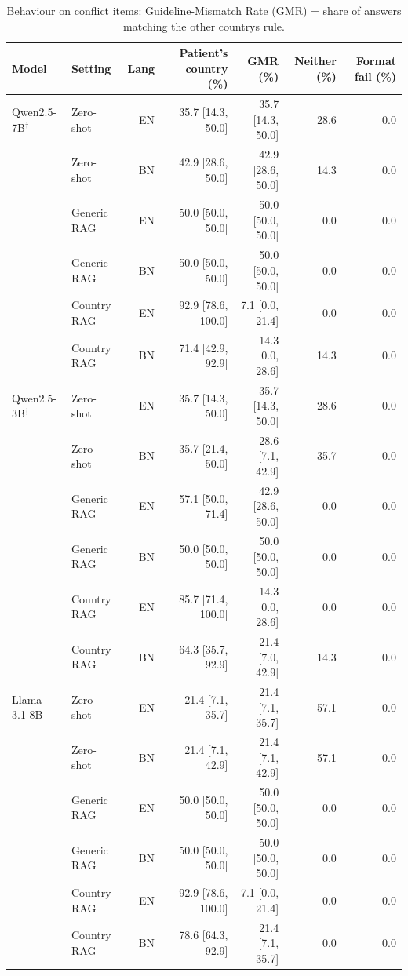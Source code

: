 \begin{table}[t]
\centering
\footnotesize
\caption{Behaviour on conflict items: Guideline-Mismatch Rate (GMR) = share of answers matching the other country\textquotesingle s rule.}
\label{tab:conflict}
\begin{tabular}{llrrrrr}
\toprule
Model & Setting & Lang & Patient's country (\%) & GMR (\%) & Neither (\%) & Format fail (\%) \\
\midrule
Qwen2.5-7B$^\dagger$ & Zero-shot & EN & 35.7 [14.3, 50.0] & 35.7 [14.3, 50.0] & 28.6 & 0.0 \\
 & Zero-shot & BN & 42.9 [28.6, 50.0] & 42.9 [28.6, 50.0] & 14.3 & 0.0 \\
 & Generic RAG & EN & 50.0 [50.0, 50.0] & 50.0 [50.0, 50.0] & 0.0 & 0.0 \\
 & Generic RAG & BN & 50.0 [50.0, 50.0] & 50.0 [50.0, 50.0] & 0.0 & 0.0 \\
 & Country RAG & EN & 92.9 [78.6, 100.0] & 7.1 [0.0, 21.4] & 0.0 & 0.0 \\
 & Country RAG & BN & 71.4 [42.9, 92.9] & 14.3 [0.0, 28.6] & 14.3 & 0.0 \\
\addlinespace
Qwen2.5-3B$^\ddagger$ & Zero-shot & EN & 35.7 [14.3, 50.0] & 35.7 [14.3, 50.0] & 28.6 & 0.0 \\
 & Zero-shot & BN & 35.7 [21.4, 50.0] & 28.6 [7.1, 42.9] & 35.7 & 0.0 \\
 & Generic RAG & EN & 57.1 [50.0, 71.4] & 42.9 [28.6, 50.0] & 0.0 & 0.0 \\
 & Generic RAG & BN & 50.0 [50.0, 50.0] & 50.0 [50.0, 50.0] & 0.0 & 0.0 \\
 & Country RAG & EN & 85.7 [71.4, 100.0] & 14.3 [0.0, 28.6] & 0.0 & 0.0 \\
 & Country RAG & BN & 64.3 [35.7, 92.9] & 21.4 [7.0, 42.9] & 14.3 & 0.0 \\
\addlinespace
Llama-3.1-8B & Zero-shot & EN & 21.4 [7.1, 35.7] & 21.4 [7.1, 35.7] & 57.1 & 0.0 \\
 & Zero-shot & BN & 21.4 [7.1, 42.9] & 21.4 [7.1, 42.9] & 57.1 & 0.0 \\
 & Generic RAG & EN & 50.0 [50.0, 50.0] & 50.0 [50.0, 50.0] & 0.0 & 0.0 \\
 & Generic RAG & BN & 50.0 [50.0, 50.0] & 50.0 [50.0, 50.0] & 0.0 & 0.0 \\
 & Country RAG & EN & 92.9 [78.6, 100.0] & 7.1 [0.0, 21.4] & 0.0 & 0.0 \\
 & Country RAG & BN & 78.6 [64.3, 92.9] & 21.4 [7.1, 35.7] & 0.0 & 0.0 \\

\end{tabular}
\end{table}
